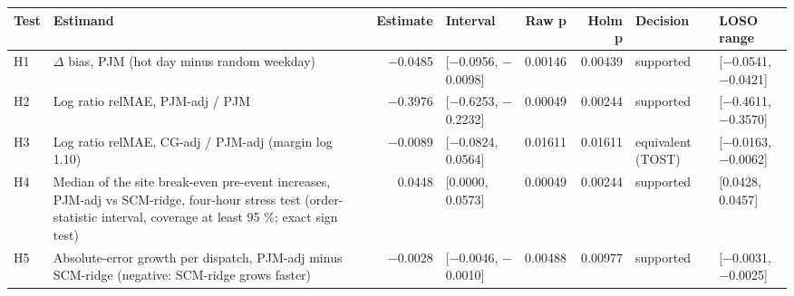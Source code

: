 \begin{tabular}{l>{\raggedright\arraybackslash}p{4.3cm}rlrrll}
\toprule
Test & Estimand & Estimate & Interval & Raw p & Holm p & Decision & LOSO range \\
\midrule
H1 & $\Delta$ bias, PJM (hot day minus random weekday) & $-$0.0485 & [$-$0.0956, $-$0.0098] & 0.00146 & 0.00439 & supported & [$-$0.0541, $-$0.0421] \\
H2 & Log ratio relMAE, PJM-adj / PJM & $-$0.3976 & [$-$0.6253, $-$0.2232] & 0.00049 & 0.00244 & supported & [$-$0.4611, $-$0.3570] \\
H3 & Log ratio relMAE, CG-adj / PJM-adj (margin log 1.10) & $-$0.0089 & [$-$0.0824, 0.0564] & 0.01611 & 0.01611 & equivalent (TOST) & [$-$0.0163, $-$0.0062] \\
H4 & Median of the site break-even pre-event increases, PJM-adj vs SCM-ridge, four-hour stress test (order-statistic interval, coverage at least 95 \%; exact sign test) & 0.0448 & [0.0000, 0.0573] & 0.00049 & 0.00244 & supported & [0.0428, 0.0457] \\
H5 & Absolute-error growth per dispatch, PJM-adj minus SCM-ridge (negative: SCM-ridge grows faster) & $-$0.0028 & [$-$0.0046, $-$0.0010] & 0.00488 & 0.00977 & supported & [$-$0.0031, $-$0.0025] \\
\bottomrule
\end{tabular}
\par{}
